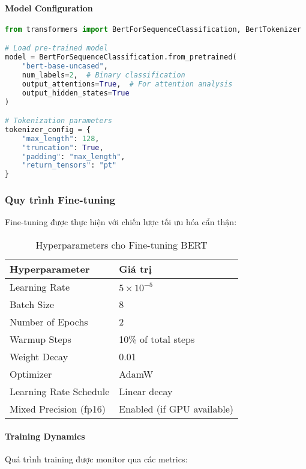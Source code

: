 \paragraph{Model Configuration}
\begin{lstlisting}[language=Python, caption=Cấu hình mô hình BERT cho sentiment analysis]
from transformers import BertForSequenceClassification, BertTokenizer

# Load pre-trained model
model = BertForSequenceClassification.from_pretrained(
    "bert-base-uncased",
    num_labels=2,  # Binary classification
    output_attentions=True,  # For attention analysis
    output_hidden_states=True
)

# Tokenization parameters
tokenizer_config = {
    "max_length": 128,
    "truncation": True,
    "padding": "max_length",
    "return_tensors": "pt"
}
\end{lstlisting}

\subsubsection{Quy trình Fine-tuning}

Fine-tuning được thực hiện với chiến lược tối ưu hóa cẩn thận:

\begin{table}[H]
\centering
\caption{Hyperparameters cho Fine-tuning BERT}
\label{tab:finetuning_params}
\begin{tabular}{ll}
\toprule
\textbf{Hyperparameter} & \textbf{Giá trị} \\
\midrule
Learning Rate & $5 \times 10^{-5}$ \\
Batch Size & 8 \\
Number of Epochs & 2 \\
Warmup Steps & 10\% of total steps \\
Weight Decay & 0.01 \\
Optimizer & AdamW \\
Learning Rate Schedule & Linear decay \\
Mixed Precision (fp16) & Enabled (if GPU available) \\
\bottomrule
\end{tabular}
\end{table}

\paragraph{Training Dynamics}
Quá trình training được monitor qua các metrics:

